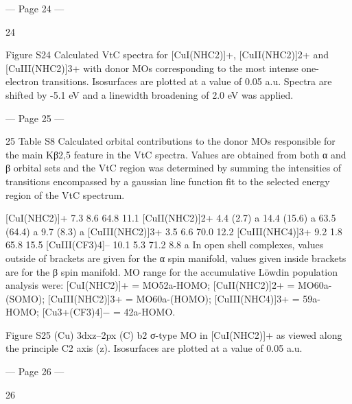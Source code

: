 --- Page 24 ---
 
24 
 
Figure S24 Calculated VtC spectra for [CuI(NHC2)]+, [CuII(NHC2)]2+ and [CuIII(NHC2)]3+ with donor MOs 
corresponding to the most intense one-electron transitions. Isosurfaces are plotted at a value of 0.05 a.u. Spectra 
are shifted by -5.1 eV and a linewidth broadening of 2.0 eV was applied. 
 


--- Page 25 ---
 
25 
Table S8 Calculated orbital contributions to the donor MOs responsible for the main Kβ2,5 feature in the VtC 
spectra. Values are obtained from both α and β orbital sets and the VtC region was determined by summing the 
intensities of transitions encompassed by a gaussian line function fit to the selected energy region of the VtC 
spectrum. 
 
[CuI(NHC2)]+ 
7.3 
8.6 
64.8 
11.1 
[CuII(NHC2)]2+ 
4.4 (2.7)
a 
14.4 (15.6)
a 
63.5 (64.4)
a 
9.7 (8.3)
a 
[CuIII(NHC2)]3+ 
3.5 
6.6 
70.0 
12.2 
[CuIII(NHC4)]3+ 
9.2 
1.8 
65.8 
15.5 
[CuIII(CF3)4]– 
10.1 
5.3 
71.2 
8.8 
a In open shell complexes, values outside of brackets are given for the α spin manifold, values given inside 
brackets are for the β spin manifold. MO range for the accumulative Löwdin population analysis were: 
[CuI(NHC2)]+ = MO52a-HOMO; [CuII(NHC2)]2+ = MO60a-(SOMO); [CuIII(NHC2)]3+ = MO60a-(HOMO); 
[CuIII(NHC4)]3+ = 59a-HOMO; [Cu3+(CF3)4]− = 42a-HOMO. 
 
 
Figure S25 (Cu) 3dxz–2px (C) b2 σ-type MO in [CuI(NHC2)]+ as viewed along the principle C2 axis (z). Isosurfaces 
are plotted at a value of 0.05 a.u. 


--- Page 26 ---
 
26 
 
